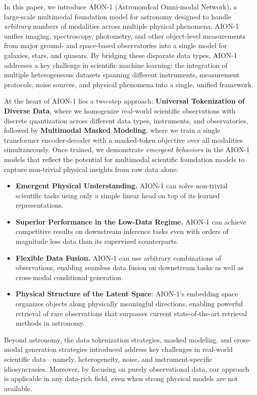\documentclass[]{polymathic}
\begin{document}
In this paper, we introduce AION-1 (AstronomIcal Omni-modal Network), a large-scale multimodal foundation model for astronomy designed to handle \emph{arbitrary} numbers of modalities across multiple physical phenomena. AION-1 unifies imaging, spectroscopy, photometry, and other object-level measurements from major ground- and space-based observatories into a single model for galaxies, stars, and quasars. By bridging these disparate data types, AION-1 addresses a key challenge in scientific machine learning: the integration of multiple heterogeneous datasets spanning different instruments, measurement protocols, noise sources, and physical phenomena into a single, unified framework.

At the heart of AION-1 lies a two-step approach: \textbf{Universal Tokenization of Diverse Data}, where we homogenize real-world scientific observations with discrete quantization across different data types, instruments, and observatories, followed by \textbf{Multimodal Masked Modeling}, where we train a single transformer encoder-decoder with a masked-token objective over all modalities simultaneously. 
Once trained, we demonstrate \emph{emergent behaviors} in the AION-1 models that reflect the potential for multimodal scientific foundation models to capture non-trivial physical insights from raw data alone:
\begin{itemize}
\item \textbf{Emergent Physical Understanding.} AION-1 can solve non-trivial scientific tasks using only a simple linear head on top of its learned representations. 
\item \textbf{Superior Performance in the Low-Data Regime.} AION-1 can achieve competitive results on downstream inference tasks even with orders of magnitude less data than its supervised counterparts. 
\item \textbf{Flexible Data Fusion.} AION-1 can use arbitrary combinations of observations, enabling seamless data fusion on downstream tasks as well as cross-modal conditional generation.
\item \textbf{Physical Structure of the Latent Space}: AION-1’s embedding space organizes objects along physically meaningful directions, enabling powerful retrieval of rare observations that surpasses current state-of-the-art retrieval methods in astronomy. 
\end{itemize}

Beyond astronomy, the data tokenization strategies, masked modeling, and cross-modal generation strategies introduced address key challenges in real-world scientific data—namely, heterogeneity, noise, and instrument-specific idiosyncrasies. Moreover, by focusing on purely observational data, our approach is applicable in any data-rich field, even when strong physical models are not available. 
\end{document}
